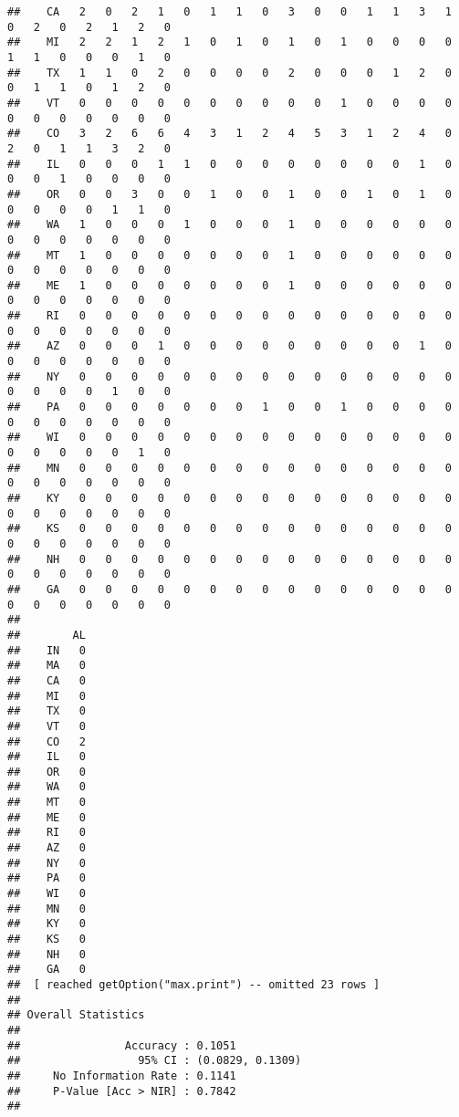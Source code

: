 \documentclass[
]{article}
\begin{document}
\begin{verbatim}
##    CA   2   0   2   1   0   1   1   0   3   0   0   1   1   3   1   0   2   0   2   1   2   0
##    MI   2   2   1   2   1   0   1   0   1   0   1   0   0   0   0   1   1   0   0   0   1   0
##    TX   1   1   0   2   0   0   0   0   2   0   0   0   1   2   0   0   1   1   0   1   2   0
##    VT   0   0   0   0   0   0   0   0   0   0   1   0   0   0   0   0   0   0   0   0   0   0
##    CO   3   2   6   6   4   3   1   2   4   5   3   1   2   4   0   2   0   1   1   3   2   0
##    IL   0   0   0   1   1   0   0   0   0   0   0   0   0   1   0   0   0   1   0   0   0   0
##    OR   0   0   3   0   0   1   0   0   1   0   0   1   0   1   0   0   0   0   0   1   1   0
##    WA   1   0   0   0   1   0   0   0   1   0   0   0   0   0   0   0   0   0   0   0   0   0
##    MT   1   0   0   0   0   0   0   0   1   0   0   0   0   0   0   0   0   0   0   0   0   0
##    ME   1   0   0   0   0   0   0   0   1   0   0   0   0   0   0   0   0   0   0   0   0   0
##    RI   0   0   0   0   0   0   0   0   0   0   0   0   0   0   0   0   0   0   0   0   0   0
##    AZ   0   0   0   1   0   0   0   0   0   0   0   0   0   1   0   0   0   0   0   0   0   0
##    NY   0   0   0   0   0   0   0   0   0   0   0   0   0   0   0   0   0   0   0   1   0   0
##    PA   0   0   0   0   0   0   0   1   0   0   1   0   0   0   0   0   0   0   0   0   0   0
##    WI   0   0   0   0   0   0   0   0   0   0   0   0   0   0   0   0   0   0   0   0   1   0
##    MN   0   0   0   0   0   0   0   0   0   0   0   0   0   0   0   0   0   0   0   0   0   0
##    KY   0   0   0   0   0   0   0   0   0   0   0   0   0   0   0   0   0   0   0   0   0   0
##    KS   0   0   0   0   0   0   0   0   0   0   0   0   0   0   0   0   0   0   0   0   0   0
##    NH   0   0   0   0   0   0   0   0   0   0   0   0   0   0   0   0   0   0   0   0   0   0
##    GA   0   0   0   0   0   0   0   0   0   0   0   0   0   0   0   0   0   0   0   0   0   0
##      
##        AL
##    IN   0
##    MA   0
##    CA   0
##    MI   0
##    TX   0
##    VT   0
##    CO   2
##    IL   0
##    OR   0
##    WA   0
##    MT   0
##    ME   0
##    RI   0
##    AZ   0
##    NY   0
##    PA   0
##    WI   0
##    MN   0
##    KY   0
##    KS   0
##    NH   0
##    GA   0
##  [ reached getOption("max.print") -- omitted 23 rows ]
## 
## Overall Statistics
##                                           
##                Accuracy : 0.1051          
##                  95% CI : (0.0829, 0.1309)
##     No Information Rate : 0.1141          
##     P-Value [Acc > NIR] : 0.7842          
##                                           

\end{verbatim}
\end{document}
